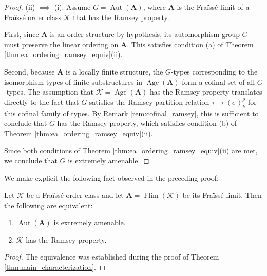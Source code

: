 \begin{proof}
    (ii) $\implies$ (i): Assume $G = \operatorname{Aut}(\mathbf{A})$, where $\mathbf{A}$ is the Fraïssé limit of a Fraïssé order class $\mathcal{K}$ that has the Ramsey property.

    First, since $\mathbf{A}$ is an order structure by hypothesis, its automorphism group $G$ must preserve the linear ordering on $\mathbf{A}$. This satisfies condition (a) of Theorem \ref{thm:ea_ordering_ramsey_equiv}(ii).

    Second, because $\mathbf{A}$ is a locally finite structure, the $G$-types corresponding to the isomorphism types of finite substructures in $\operatorname{Age}(\mathbf{A})$ form a cofinal set of all $G$-types. The assumption that $\mathcal{K} = \operatorname{Age}(\mathbf{A})$ has the Ramsey property translates directly to the fact that $G$ satisfies the Ramsey partition relation $\tau \to (\sigma)^\rho_k$ for this cofinal family of types. By Remark \ref{rem:cofinal_ramsey}, this is sufficient to conclude that $G$ has the Ramsey property, which satisfies condition (b) of Theorem \ref{thm:ea_ordering_ramsey_equiv}(ii).

    Since both conditions of Theorem \ref{thm:ea_ordering_ramsey_equiv}(ii) are met, we conclude that $G$ is extremely amenable.
\end{proof}



We make explicit the following fact observed in the preceding proof.

\begin{theorem}
    \label{thm:fraisse_ramsey_equiv}
    Let $\mathcal{K}$ be a Fraïssé order class and let $\mathbf{A} = \operatorname{Flim}(\mathcal{K})$ be its Fraïssé limit. Then the following are equivalent:
    \begin{enumerate}
        \item[(i)] $\operatorname{Aut}(\mathbf{A})$ is extremely amenable.
        \item[(ii)] $\mathcal{K}$ has the Ramsey property.
    \end{enumerate}
\end{theorem}

\begin{proof}
    The equivalence was established during the proof of Theorem \ref{thm:main_characterization}.
\end{proof}

